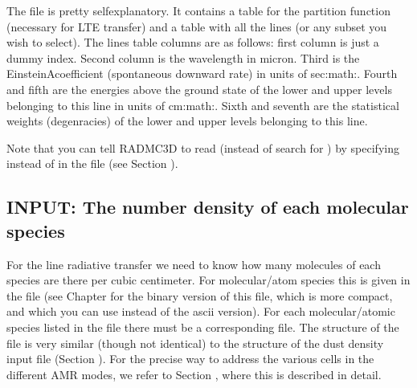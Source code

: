 \documentclass[letterpaper,10pt,english]{sphinxmanual}
\begin{document}
The file is pretty self\sphinxhyphen{}explanatory. It contains a table for the partition
function (necessary for LTE transfer) and a table with all the lines (or any
subset you wish to select). The lines table columns are as follows: first column
is just a dummy index. Second column is the wavelength in micron. Third is the
Einstein\sphinxhyphen{}A\sphinxhyphen{}coefficient (spontaneous downward rate) in units of
sec:math:. Fourth and fifth are the energies above the ground state of
the lower and upper levels belonging to this line in units of
cm:math:. Sixth and seventh are the statistical weights (degenracies) of
the lower and upper levels belonging to this line.

Note that you can tell RADMC\sphinxhyphen{}3D to read  (instead of search
for ) by specifying  instead of  in
the  file (see Section {\hyperref[\detokenize{lineradtrans:sec-line-dot-inp}]{}}).


\subsection{INPUT: The number density of each molecular species}
\label{\detokenize{lineradtrans:input-the-number-density-of-each-molecular-species}}\label{\detokenize{lineradtrans:sec-mol-numdensity}}
For the line radiative transfer we need to know how many molecules of each
species are there per cubic centimeter. For molecular/atom species  this
is given in the file  (see Chapter {\hyperref[\detokenize{binaryio:chap-binary-io}]{}}
for the binary version of this file, which is more compact, and which you can
use instead of the ascii version). For each molecular/atomic species listed in
the  file there must be a corresponding 
file. The structure of the file is very similar (though not identical) to the
structure of the dust density input file  (Section
{\hyperref[\detokenize{inputoutputfiles:sec-dustdens}]{}}). For the precise way to address the various cells in the
different AMR modes, we refer to Section {\hyperref[\detokenize{inputoutputfiles:sec-dustdens}]{}}, where this is
described in detail.
\end{document}
